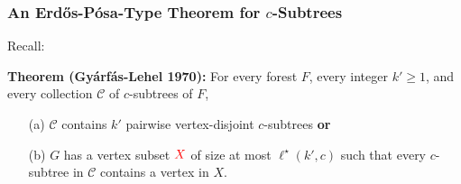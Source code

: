 \documentclass{beamer}
\begin{document}
\begin{frame}
  \frametitle{An Erdős-Pósa-Type Theorem for $c$-Subtrees}

  Recall:

  \noindent\textbf{Theorem (Gyárfás-Lehel 1970):} For every forest $F$, every integer $k'\ge 1$, and every collection $\mathcal{C}$ of $c$-subtrees of $F$,
  \begin{enumerate}%
    \item[(a)] $\mathcal{C}$ contains $k'$ pairwise vertex-disjoint $c$-subtrees \textbf{or}
    \item[(b)] $G$ has a vertex subset $\mathcolor{red}{X}$ of size at most $\ell^\star(k',c)$ such that every $c$-subtree in $\mathcal{C}$ contains a vertex in $X$.
  \end{enumerate}
  \vspace{3ex}
  \\[1ex]
  \vspace{2ex}
\end{frame}
\end{document}
